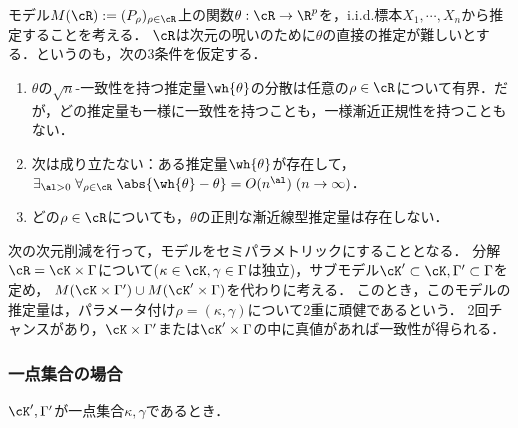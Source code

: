 \documentclass[uplatex,dvipdfmx]{jsreport}
\begin{document}
\begin{notation}
    モデル$M(\cR):=(P_\rho)_{\rho\in\cR}$上の関数$\theta:\cR\to\R^p$を，i.i.d.標本$X_1,\cdots,X_n$から推定することを考える．
    $\cR$は次元の呪いのために$\theta$の直接の推定が難しいとする．というのも，次の3条件を仮定する．
    \begin{enumerate}
        \item $\theta$の$\sqrt{n}$-一致性を持つ推定量$\wh{\theta}$の分散は任意の$\rho\in\cR$について有界．だが，どの推定量も一様に一致性を持つことも，一様漸近正規性を持つこともない．
        \item 次は成り立たない：ある推定量$\wh{\theta}$が存在して，$\exists_{\al>0}\;\forall_{\rho\in\cR}\;\abs{\wh{\theta}-\theta}=O(n^\al)\;(n\to\infty)$．
        \item どの$\rho\in\cR$についても，$\theta$の正則な漸近線型推定量は存在しない．
    \end{enumerate}
\end{notation}

\begin{discussion}
    次の次元削減を行って，モデルをセミパラメトリックにすることとなる．
    分解$\cR=\cK\times\Gamma$について($\kappa\in\cK,\gamma\in\Gamma$は独立)，サブモデル$\cK'\subset\cK,\Gamma'\subset\Gamma$を定め，
    $M(\cK\times\Gamma')\cup M(\cK'\times\Gamma)$を代わりに考える．
    このとき，このモデルの推定量は，パラメータ付け$\rho=(\kappa,\gamma)$について2重に頑健であるという．
    2回チャンスがあり，$\cK\times\Gamma'$または$\cK'\times\Gamma$の中に真値があれば一致性が得られる．
\end{discussion}

\subsubsection{一点集合の場合}

\begin{tcolorbox}[colframe=ForestGreen, colback=ForestGreen!10!white,breakable,colbacktitle=ForestGreen!40!white,coltitle=black,fonttitle=\bfseries\sffamily,
title=]
    $\cK',\Gamma'$が一点集合$\kappa,\gamma$であるとき．
\end{tcolorbox}
\end{document}
